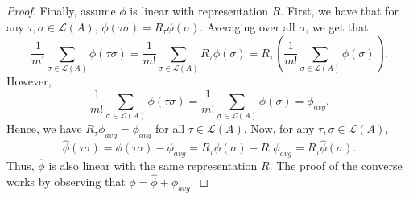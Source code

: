 \documentclass[prodmode,acmec]{ec-acmsmall}
\newcommand{\calL}{{\mathcal{L}}}
\newcommand{\rank}{{\calL(A)}}
\DeclareMathOperator*{\argmin}{arg\,min}
\begin{document}
\begin{proof}
Finally, assume $\phi$ is linear with representation $R$. First, we have that for any $\tau,\sigma \in \rank$, $\phi(\tau \sigma) = R_{\tau}\phi(\sigma)$. Averaging over all $\sigma$, we get that 
$$
\frac{1}{m!} \sum_{\sigma \in \rank} \phi(\tau \sigma) = \frac{1}{m!}  \sum_{\sigma \in \rank} R_{\tau} \phi(\sigma) = R_{\tau} \left (\frac{1}{m!}  \sum_{\sigma \in \rank} \phi(\sigma) \right).
$$
However, 
$$
\frac{1}{m!}  \sum_{\sigma \in \rank} \phi(\tau \sigma) = \frac{1}{m!}  \sum_{\sigma \in \rank} \phi(\sigma) = \phi_{avg}.
$$
Hence, we have $R_{\tau}\phi_{avg} = \phi_{avg}$ for all $\tau \in \rank$. Now, for any $\tau,\sigma \in \rank$, 
$$
\hat{\phi}(\tau \sigma) = \phi(\tau \sigma) - \phi_{avg} = R_{\tau}\phi(\sigma) - R_{\tau}\phi_{avg} = R_{\tau}\hat{\phi}(\sigma).
$$
Thus, $\hat{\phi}$ is also linear with the same representation $R$. The proof of the converse works by observing that $\phi = \hat{\phi}+\phi_{avg}$. 
%
%
\end{proof}
\end{document}
